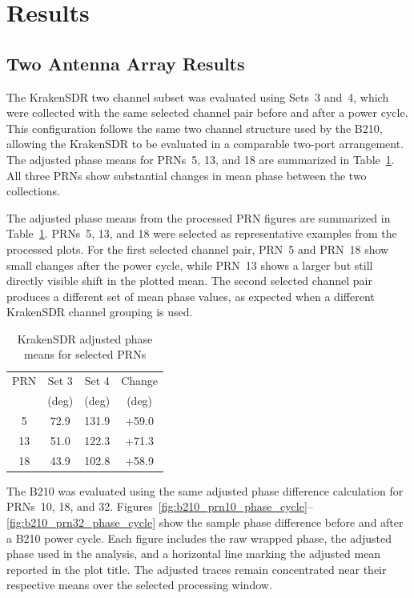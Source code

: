 \documentclass[conference]{IEEEtran}
\begin{document}
\section{Results}

\subsection{Two Antenna Array Results}
The KrakenSDR two channel subset was evaluated using Sets~3 and~4, which were collected with the same selected channel pair before and after a power cycle. This configuration follows the same two channel structure used by the B210, allowing the KrakenSDR to be evaluated in a comparable two-port arrangement. The adjusted phase means for PRNs~5, 13, and 18 are summarized in Table~\ref{tab:kraken_two_channel_phase}. All three PRNs show substantial changes in mean phase between the two collections.

The adjusted phase means from the processed PRN figures are summarized in Table~\ref{tab:kraken_two_channel_phase}. PRNs~5, 13, and 18 were selected as representative examples from the processed plots. For the first selected channel pair, PRN~5 and PRN~18 show small changes after the power cycle, while PRN~13 shows a larger but still directly visible shift in the plotted mean. The second selected channel pair produces a different set of mean phase values, as expected when a different KrakenSDR channel grouping is used.

\begin{table}[H]
\centering
\caption{KrakenSDR adjusted phase means for selected PRNs}
\label{tab:kraken_two_channel_phase}
\begin{tabular}{cccc}
\toprule
PRN & Set 3 & Set 4 & Change \\
 & (deg) & (deg) & (deg) \\
\midrule
5  & 72.9 & 131.9 & +59.0 \\
13 & 51.0 & 122.3 & +71.3 \\
18 & 43.9 & 102.8 & +58.9 \\
\bottomrule
\end{tabular}
\end{table}

The B210 was evaluated using the same adjusted phase difference calculation for PRNs~10, 18, and 32. Figures~\ref{fig:b210_prn10_phase_cycle}--\ref{fig:b210_prn32_phase_cycle} show the sample phase difference before and after a B210 power cycle. Each figure includes the raw wrapped phase, the adjusted phase used in the analysis, and a horizontal line marking the adjusted mean reported in the plot title. The adjusted traces remain concentrated near their respective means over the selected processing window.
\end{document}

